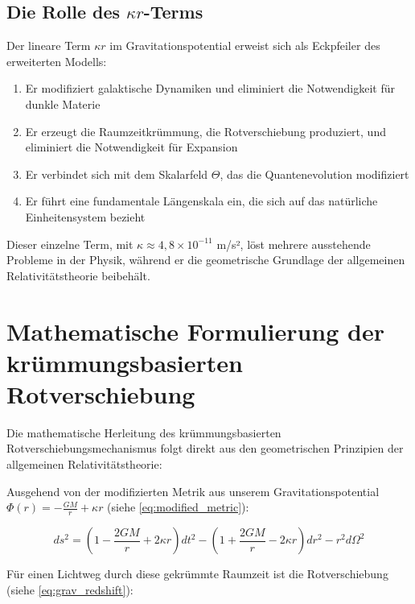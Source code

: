 \documentclass[12pt,a4paper]{article}
\begin{document}
	\subsection{Die Rolle des $\kappa r$-Terms}
	\label{subsec:kappa_r_role}
	
	Der lineare Term $\kappa r$ im Gravitationspotential erweist sich als Eckpfeiler des erweiterten Modells\cite{pascher_galaxies_2025}:
	
	\begin{enumerate}
		\item Er modifiziert galaktische Dynamiken und eliminiert die Notwendigkeit für dunkle Materie\cite{mcgaugh2016, pascher_galaxies_2025}
		\item Er erzeugt die Raumzeitkrümmung, die Rotverschiebung produziert, und eliminiert die Notwendigkeit für Expansion\cite{pascher_messdifferenzen_2025}
		\item Er verbindet sich mit dem Skalarfeld $\Theta$, das die Quantenevolution modifiziert\cite{pascher_lagrange_2025}
		\item Er führt eine fundamentale Längenskala ein, die sich auf das natürliche Einheitensystem bezieht\cite{pascher_params_2025}
	\end{enumerate}
	
	Dieser einzelne Term, mit $\kappa \approx 4,8\times10^{-11}$ m/s², löst mehrere ausstehende Probleme in der Physik, während er die geometrische Grundlage der allgemeinen Relativitätstheorie beibehält.
	
	\section{Mathematische Formulierung der krümmungsbasierten Rotverschiebung}
	\label{sec:math_formulation}
	
	Die mathematische Herleitung des krümmungsbasierten Rotverschiebungsmechanismus folgt direkt aus den geometrischen Prinzipien der allgemeinen Relativitätstheorie\cite{weinberg1972}:
	
	Ausgehend von der modifizierten Metrik aus unserem Gravitationspotential $\Phi(r) = -\frac{GM}{r} + \kappa r$ (siehe \cref{eq:modified_metric}):
	
	\begin{equation}
		ds^2 = (1 - \frac{2GM}{r} + 2\kappa r)dt^2 - (1 + \frac{2GM}{r} - 2\kappa r)dr^2 - r^2d\Omega^2
	\end{equation}
	
	Für einen Lichtweg durch diese gekrümmte Raumzeit ist die Rotverschiebung (siehe \cref{eq:grav_redshift}):
	
\end{document}

